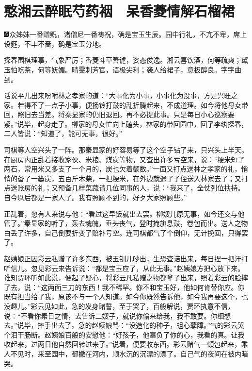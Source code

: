 
\chapter{憨湘云醉眠芍药裀　呆香菱情解石榴裙}

{\includegraphics[width=3mm]{../Images/00005}众姊妹一番赠}贶{，诸僧尼一番祷祝，确是宝玉生辰。园中行礼，不亢不卑，席上设筵，不丰不啬，确是宝玉分地。}

{探春围棋理事，气象严厉；香菱斗草善谑，姿态俊逸。湘云喜饮酒，何等疏爽；黛玉怕吃茶，何等妩媚。晴雯刺芳官，语极尖利；袭人给裙子，意极醇良。字字曲到。}

话说平儿出来吩咐林之孝家的道：``大事化为小事，小事化为没事，方是兴旺之家。若得不了一点子小事，便扬铃打鼓的乱折腾起来，不成道理。如今将他母女带回，照旧去当差。将秦显家的仍旧退回。再不必提此事。只是每日小心巡察要紧。''说毕，起身走了。柳家的母女忙向上磕头，林家的带回园中，回了李纨探春，二人皆说：``知道了，能可无事，很好。''

司棋等人空兴头了一阵。那秦显家的好容易等了这个空子钻了来，只兴头上半天。在厨房内正乱着接收家伙、米粮、煤炭等物，又查出许多亏空来，说：``粳米短了两石，常用米又多支了一个月的，炭也欠着额数。''一面又打点送林之孝家的礼，悄悄的备了一篓炭，五百斤木柴，一担粳米，在外边就遣了子侄送入林家去了；又打点送账房的礼；又预备几样菜蔬请几位同事的人，说：``我来了，全仗列位扶持。自今以后都是一家人了。我有照顾不到的，好歹大家照顾些。''

正乱着，忽有人来说与他：``看过这早饭就出去罢。柳嫂儿原无事，如今还交与他管了。''秦显家的听了，轰去魂魄，垂头丧气，登时掩旗息鼓，卷包而出。送人之物白丢了许多，自己倒要折变了赔补亏空。连司棋都气了个倒仰，无计挽回，只得罢了。

赵姨娘正因彩云私赠了许多东西，被玉钏儿吵出，生恐查诘出来，每日捏一把汗打听信儿。忽见彩云来告诉说：``都是宝玉应了，从此无事。''赵姨娘方把心放下来。谁知贾环听如此说，便起了疑心，将彩云凡私赠之物都拿了出来，照着彩云的脸摔了去，说：``这两面三刀的东西！我不稀罕。你不和宝玉好，他如何肯替你应。你既有担当给了我，原该不与一个人知道。如今你既然告诉他，如今我再要这个，也没趣儿。''彩云见如此，急的发身赌誓，至于哭了，百般解说，贾环执意不信，说：``不看你素日之情，去告诉二嫂子，就说你偷来给我，我不敢要。你细想去。''说毕，摔手出去了。急的赵姨娘骂：``没造化的种子，蛆心孽障。''气的彩云哭个泪干肠断。赵姨娘百般的安慰他：``好孩子，他辜负了你的心，我看的真。让我收起来，过两日他自然回转过来了。''说着，便要收东西。彩云赌气一顿包起来，乘人不见时，来至园中，都撇在河内，顺水沉的沉漂的漂了。自己气的夜间在被内暗哭。

